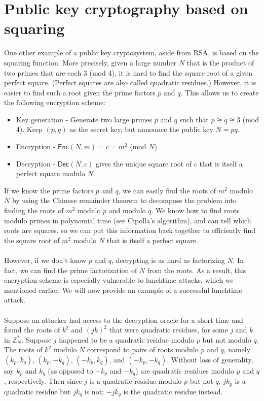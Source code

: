 \documentclass[10pt]{article}
\begin{document}
\section{Public key cryptography based on squaring}
One other example of a public key cryptosystem, aside from RSA, is based on the squaring function.  More precisely, given a large number $ N $ that is the product of two primes that are each 3 (mod 4), it is hard to find the square root of a given perfect square. (Perfect squares are also called quadratic residues.)  However, it is easier to find such a root given the prime factors $ p $ and $ q $.  This allows us to create the following encryption scheme:
\begin{itemize}
\item Key generation - Generate two large primes $ p $ and $ q $ such that $ p \cong q \cong 3 $ (mod 4).  Keep $ (p,q) $ as the secret key, but announce the public key $ N = pq $.
\item Encryption - $ \mathsf{Enc}(N, m) = c = m^2 $ (mod $ N $)
\item Decryption - $ \mathsf{Dec}(N, c) $ gives the unique square root of $ c $ that is itself a perfect square modulo $ N $.
\end{itemize}
If we know the prime factors $ p $ and $ q $, we can easily find the roots of $ m^2 $ modulo $ N $ by using the Chinese remainder theorem to decompose the problem into finding the roots of $ m^2 $ modulo $ p $ and modulo $ q $.  We know how to find roots modulo primes in polynomial time (see Cipolla's algorithm), and can tell which roots are squares, so we can put this information back together to efficiently find the square root of $ m^2 $ modulo $ N $ that is itself a perfect square.
\\ ~ \\
However, if we don't know $ p $ and $ q $, decrypting is as hard as factorizing $ N $.  In fact, we can find the prime factorization of $ N $ from the roots.  As a result, this encryption scheme is especially vulnerable to lunchtime attacks, which we mentioned earlier.  We will now provide an example of a successful lunchtime attack.
\\ ~ \\
Suppose an attacker had access to the decryption oracle for a short time and found the roots of $ k^2 $ and $ (jk)^2 $ that were quadratic residues, for some $ j $ and $ k $ in $ \mathbb{Z}_N^\ast $.  Suppose $ j $ happened to be a quadratic residue modulo $ p $ but not modulo $ q $.  The roots of $ k^2 $ modulo $ N $ correspond to pairs of roots modulo $ p $ and $ q $, namely $ (k_p, k_q) $, $ (k_p, -k_q) $, $ (-k_p, k_q) $, and $ (-k_p, -k_q) $.  Without loss of generality, say $ k_p $ and $ k_q $ (as opposed to $ -k_p $ and $ -k_q $) are quadratic residues modulo $ p $ and $ q $, respectively.  Then since $ j $ is a quadratic residue modulo $ p $ but not $ q $, $ jk_p $ is a quadratic residue but $ jk_q $ is not; $ -jk_q $ is the quadratic residue instead.
\end{document}
